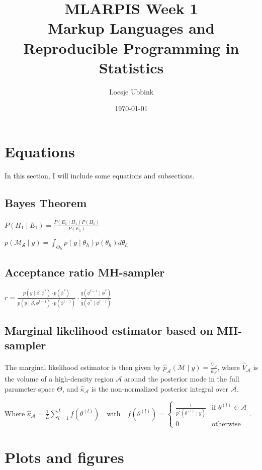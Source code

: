 \documentclass[10pt, a4paper, titlepage]{article}
\title{MLARPIS Week 1\\ \small Markup Languages and Reproducible Programming in Statistics}
\author{Loesje Ubbink}
\date{\today}
\begin{document}
\maketitle
\newpage

\section{Equations}

In this section, I will include some equations and subsections.

\subsection{Bayes Theorem}

$P(H_1\mid E_1) = \frac{P(E_1\mid H_1)P(H_1)}{P(E_1)}$

$p(\mathcal{M_h}\mid y) = \int_{\Theta_h} p(y \mid \theta_h)p(\theta_h) d \theta_h$

\subsection{Acceptance ratio MH-sampler}
$r = \frac {p(y \mid \beta,\phi^*) \cdot p(\phi^*)}{p(y \mid \beta,\phi^{t-1}) \cdot p(\phi^{t-1})}\cdot \frac{q(\phi^{t-1}\mid \phi^*)}{q(\phi^*\mid \phi^{t-1})}$

\subsection{Marginal likelihood estimator based on MH-sampler}
The marginal likelihood estimator is then given by $\widehat{p}_{\mathcal{A}}(\mathcal{M}\mid y) = \frac{\widehat{V}_{\mathcal{A}}}{\widehat{\kappa}_{\mathcal{A}}}$, where $\widehat{V}_{\mathcal{A}}$ is the volume of a high-density region $\mathcal{A}$ around the posterior mode in the full parameter space $\Theta$, and $\widehat{\kappa}_{\mathcal{A}}$ is the non-normalized posterior integral over $\mathcal{A}$. 

Where $\widehat{\kappa}_{\mathcal{A}} =\frac{1}{L} \sum_{l=1}^{L} f(\theta^{(l)}) \quad \text{with}\quad f(\theta^{(l)}) = \begin{cases}\frac{1}{p^*(\theta^{(l)} \mid y)} & \text{if }\theta^{(l)} \in \mathcal{A} \\0 & \text{otherwise}\end{cases}$.

\section{Plots and figures}
\end{document}
